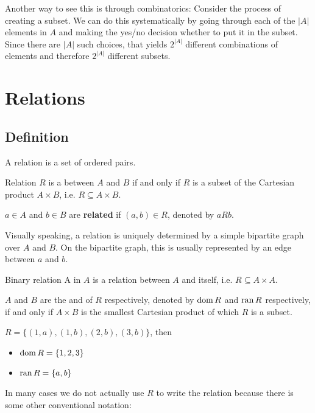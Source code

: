 Another way to see this is through combinatorics: Consider the process of creating a subset. We can do this systematically by going through each of the $|A|$ elements in $A$ and making the yes/no decision whether to put it in the subset. Since there are $|A|$ such choices, that yields $2^{|A|}$ different combinations of elements and therefore $2^{|A|}$ different subsets.

\pagebreak

\section{Relations}
\subsection{Definition}
A relation is a set of ordered pairs.

\begin{defn}{Relation}{}
$R$ is a  between $A$ and $B$ if and only if $R$ is a subset of the Cartesian product $A \times B$, i.e. $R \subseteq A \times B$.

$a \in A$ and $b \in B$ are \textbf{related} if $(a,b) \in R$, denoted by $a R b$.
\end{defn}

Visually speaking, a relation is uniquely determined by a simple bipartite graph over $A$ and $B$. On the bipartite graph, this is usually represented by an edge between $a$ and $b$.

\begin{defn}{Binary relation}{}
A  in $A$ is a relation between $A$ and itself, i.e. $R \subseteq A \times A$.
\end{defn}

$A$ and $B$ are the  and  of $R$ respectively, denoted by $\operatorname{dom} R$ and $\operatorname{ran} R$ respectively, if and only if $A \times B$ is the smallest Cartesian product of which $R$ is a subset.

\begin{exmp}{}{}
$R = \{(1,a), (1,b), (2,b), (3,b)\}$, then 
\begin{itemize}
\item $\operatorname{dom} R = \{1,2,3\}$
\item $\operatorname{ran} R = \{a,b\}$
\end{itemize}
\end{exmp}

In many cases we do not actually use $R$ to write the relation because there is some other conventional notation:

